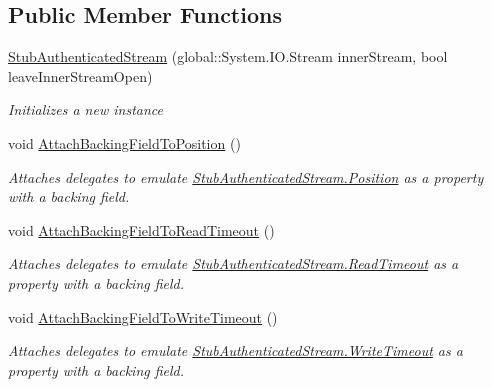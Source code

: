 \subsection*{Public Member Functions}
\begin{DoxyCompactItemize}
\item 
\hyperlink{class_system_1_1_net_1_1_security_1_1_fakes_1_1_stub_authenticated_stream_a81395ba7b05cae440e52903b5c527315}{Stub\-Authenticated\-Stream} (global\-::\-System.\-I\-O.\-Stream inner\-Stream, bool leave\-Inner\-Stream\-Open)
\begin{DoxyCompactList}\small\item\em Initializes a new instance\end{DoxyCompactList}\item 
void \hyperlink{class_system_1_1_net_1_1_security_1_1_fakes_1_1_stub_authenticated_stream_a6f6e695427556c393b54bb037fa52ec7}{Attach\-Backing\-Field\-To\-Position} ()
\begin{DoxyCompactList}\small\item\em Attaches delegates to emulate \hyperlink{class_system_1_1_net_1_1_security_1_1_fakes_1_1_stub_authenticated_stream_afbef2b6a54ed0628f5cb560eccacfbcf}{Stub\-Authenticated\-Stream.\-Position} as a property with a backing field.\end{DoxyCompactList}\item 
void \hyperlink{class_system_1_1_net_1_1_security_1_1_fakes_1_1_stub_authenticated_stream_a0d23ce17274a48e890cbd11f071ce8e9}{Attach\-Backing\-Field\-To\-Read\-Timeout} ()
\begin{DoxyCompactList}\small\item\em Attaches delegates to emulate \hyperlink{class_system_1_1_net_1_1_security_1_1_fakes_1_1_stub_authenticated_stream_a6f25cd75b801c62de2dae0f9a6842bc7}{Stub\-Authenticated\-Stream.\-Read\-Timeout} as a property with a backing field.\end{DoxyCompactList}\item 
void \hyperlink{class_system_1_1_net_1_1_security_1_1_fakes_1_1_stub_authenticated_stream_a8a041181dfbcc79ed59d616935e18dfe}{Attach\-Backing\-Field\-To\-Write\-Timeout} ()
\begin{DoxyCompactList}\small\item\em Attaches delegates to emulate \hyperlink{class_system_1_1_net_1_1_security_1_1_fakes_1_1_stub_authenticated_stream_a765d640afb4d46c4a08e999fdb4c9bde}{Stub\-Authenticated\-Stream.\-Write\-Timeout} as a property with a backing field.\end{DoxyCompactList}\item 

\end{DoxyCompactItemize}
